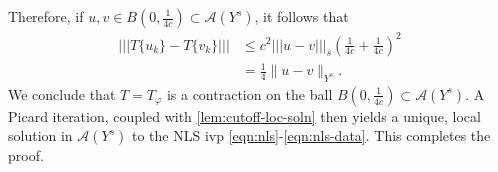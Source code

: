 \documentclass[12pt,reqno]{amsart}
\numberwithin{equation}{section}  %
\numberwithin{figure}{section}
\newcommand{\vp}{\varphi}
\theoremstyle{plain}
\theoremstyle{definition}
\theoremstyle{remark}
\begin{document}
%
%
Therefore, if $u, v \in B(0, \frac{1}{4c}) \subset \mathcal{A}(Y^s)$, it follows that
%
\begin{equation}
  \label{21a}
  \begin{split}
    |  | |T\{u_k\} - T\{v_k\} |  | |
    & \le c^2 | | |u -v |  | |_{s} \left( \frac{1}{4c} + 
    \frac{1}{4c} \right)^2
    \\
    & = \frac{1}{4} \|u -v \|_{Y^s}. 
  \end{split}
\end{equation}
%
We conclude that $T = T_{\vp}$ is a contraction on the ball $B(0, 
\frac{1}{4c}) \subset \mathcal{A}(Y^s)$. A Picard iteration, coupled with
\cref{lem:cutoff-loc-soln} then yields a unique, local
solution in $\mathcal{A}(Y^s)$ to the NLS ivp
\eqref{eqn:nls}-\eqref{eqn:nls-data}. This completes the proof. \qquad
\qedsymbol
%
%
%
%
\end{document}
